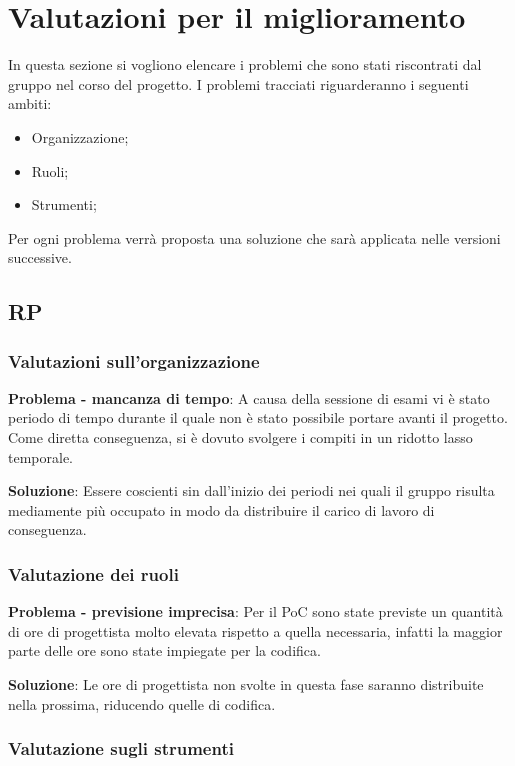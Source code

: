 \section{Valutazioni per il miglioramento}
In questa sezione si vogliono elencare i problemi che sono stati riscontrati dal gruppo nel corso del progetto.
I problemi tracciati riguarderanno i seguenti ambiti:
\begin{itemize}
\item Organizzazione;
\item Ruoli;
\item Strumenti;
\end{itemize}
Per ogni problema verrà proposta una soluzione che sarà applicata nelle versioni successive.

\subsection{RP}
\subsubsection{Valutazioni sull'organizzazione}
\textbf{Problema - mancanza di tempo}: A causa della sessione di esami vi è stato periodo di tempo durante il quale non è stato possibile portare avanti il progetto. Come diretta conseguenza, si è dovuto svolgere i compiti in un ridotto lasso temporale.

\textbf{Soluzione}: Essere coscienti sin dall'inizio dei periodi nei quali il gruppo risulta mediamente più occupato in modo da distribuire il carico di lavoro di conseguenza. 

\subsubsection{Valutazione dei ruoli}

\textbf{Problema - previsione imprecisa}: Per il PoC sono state previste un quantità di ore di progettista molto elevata rispetto a quella necessaria, infatti la maggior parte delle ore sono state impiegate per la codifica.

\textbf{Soluzione}: Le ore di progettista non svolte in questa fase saranno distribuite nella prossima, riducendo quelle di codifica.


\subsubsection{Valutazione sugli strumenti}

